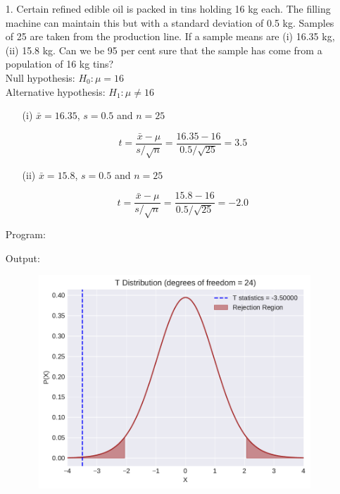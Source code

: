 \documentclass[a4paper,11pt,openright]{report}
\begin{document}
\begin{enumerate}

\item[1.] Certain refined edible oil is packed in tins holding 16 kg each. The filling
machine can maintain this but with a standard deviation of 0.5 kg. Samples of 25 are taken
from the production line. If a sample means are (i) 16.35 kg, (ii) 15.8 kg. Can we be 95 per
cent sure that the sample has come from a population of 16 kg tins? \\

Null hypothesis: $H_{0}: \mu = 16$ \\
Alternative hypothesis: $H_{1}: \mu \neq 16$ 

\begin{enumerate}
\item[(i)] $\bar x = 16.35$, $s = 0.5$ and $n = 25$ 

\begin{equation*}
t = \frac{\bar x - \mu}{s/\sqrt{n}}
  = \frac{16.35 - 16}{0.5/\sqrt{25}} 
  = 3.5
\end{equation*}

\item[(ii)] $\bar x = 15.8$, $s = 0.5$ and $n = 25$

\begin{equation*}
t = \frac{\bar x - \mu}{s/\sqrt{n}}
  = \frac{15.8 - 16}{0.5/\sqrt{25}}
  = -2.0
\end{equation*}	

\end{enumerate}

\vspace{1cm}

Program:


\vspace{1cm}

Output:


\begin{figure}[ht!]
\includegraphics[width=16cm,height=8cm,keepaspectratio]{tscript1a.pdf}
\centering
\end{figure}


\end{enumerate}
\end{document}
